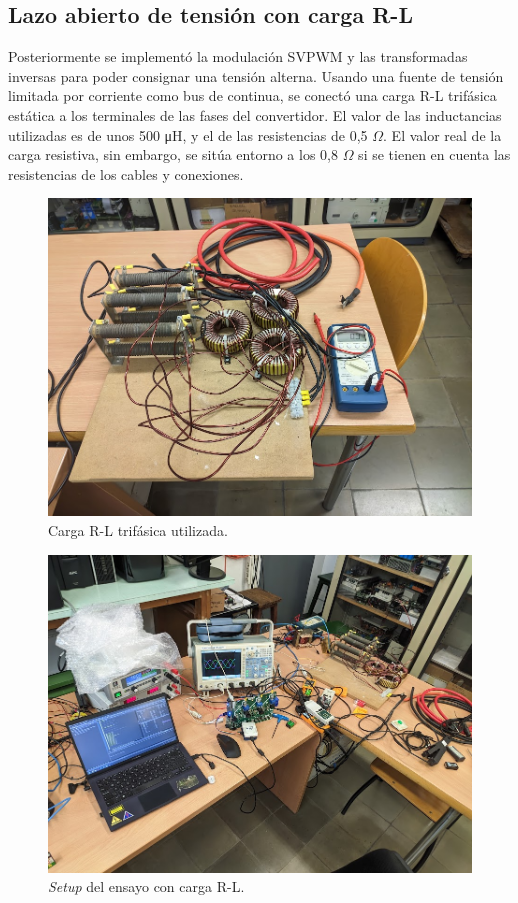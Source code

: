 
\subsection{Lazo abierto de tensión con carga R-L}

Posteriormente se implementó la modulación SVPWM y las transformadas inversas para poder consignar una tensión alterna. Usando una fuente de tensión limitada por corriente como bus de continua, se conectó una carga R-L trifásica estática a los terminales de las fases del convertidor. El valor de las inductancias utilizadas es de unos 500 \unit{\micro\henry}, y el de las resistencias de 0,5 $\Omega$. El valor real de la carga resistiva, sin embargo, se sitúa entorno a los 0,8 $\Omega$ si se tienen en cuenta las resistencias de los cables y conexiones.

\begin{figure}[H]
	\centering
	\includegraphics[width=0.7\linewidth]{fig/3RL-load}
	\caption{Carga R-L trifásica utilizada.}
\end{figure}

\begin{figure}[H]
	\centering
	\includegraphics[width=0.7\linewidth]{fig/3RL-setup}
	\caption{\textit{Setup} del ensayo con carga R-L.}
\end{figure}

